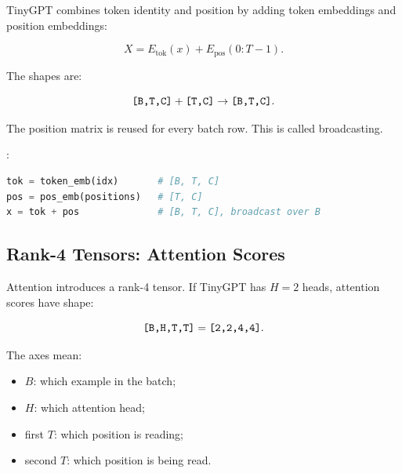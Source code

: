 TinyGPT combines token identity and position by adding token embeddings and position embeddings:

\[
X = E_{\text{tok}}(x) + E_{\text{pos}}(0:T-1).
\]

The shapes are:

\[
\texttt{[B,T,C]} + \texttt{[T,C]} \rightarrow \texttt{[B,T,C]}.
\]

The position matrix \shape{[T,C]} is reused for every batch row. This is called broadcasting.

\begin{center}
\end{center}

:

\begin{lstlisting}[language=Python]
tok = token_emb(idx)       # [B, T, C]
pos = pos_emb(positions)   # [T, C]
x = tok + pos              # [B, T, C], broadcast over B
\end{lstlisting}

\subsection{Rank-4 Tensors: Attention Scores}

Attention introduces a rank-4 tensor. If TinyGPT has \(H=2\) heads, attention scores have shape:

\[
\texttt{[B,H,T,T]} = \texttt{[2,2,4,4]}.
\]

The axes mean:

\begin{itemize}
  \item \(B\): which example in the batch;
  \item \(H\): which attention head;
  \item first \(T\): which position is reading;
  \item second \(T\): which position is being read.
\end{itemize}

